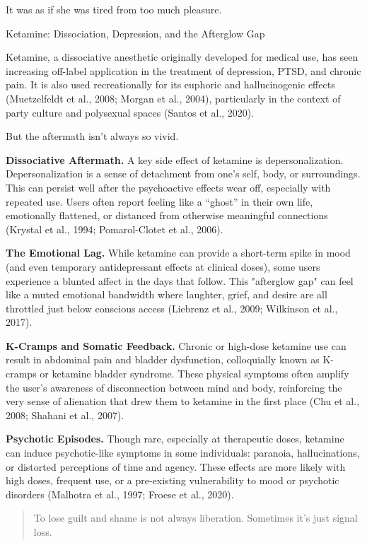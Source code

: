 It was as if she was tired from too much pleasure.

\medskip

\begin{TechnicalSidebar}{Ketamine: Dissociation, Depression, and the Afterglow Gap}

  Ketamine, a dissociative anesthetic originally developed for medical use, has seen increasing 
  off-label application in the treatment of depression, PTSD, and chronic pain. It is also used 
  recreationally for its euphoric and hallucinogenic effects (Muetzelfeldt et al., 2008; Morgan et al., 2004), 
  particularly in the context of party culture and polysexual spaces (Santos et al., 2020).

  \medskip
  
  But the aftermath isn’t always so vivid.

  \medskip
  
  \textbf{Dissociative Aftermath.}  
  A key side effect of ketamine is depersonalization. Depersonalization is a sense of detachment from one’s self, body, 
  or surroundings. This can persist well after the psychoactive effects wear off, especially with 
  repeated use. Users often report feeling like a “ghost” in their own life, emotionally flattened, 
  or distanced from otherwise meaningful connections (Krystal et al., 1994; Pomarol-Clotet et al., 2006).

  \medskip
  
  \textbf{The Emotional Lag.}  
  While ketamine can provide a short-term spike in mood (and even temporary antidepressant effects 
  at clinical doses), some users experience a blunted affect in the days that follow. This "afterglow 
  gap" can feel like a muted emotional bandwidth where laughter, grief, and desire are all throttled 
  just below conscious access (Liebrenz et al., 2009; Wilkinson et al., 2017).
  
  \medskip

  \textbf{K-Cramps and Somatic Feedback.}  
  Chronic or high-dose ketamine use can result in abdominal pain and bladder dysfunction, colloquially 
  known as K-cramps or ketamine bladder syndrome. These physical symptoms often amplify the user's 
  awareness of disconnection between mind and body, reinforcing the very sense of alienation that 
  drew them to ketamine in the first place (Chu et al., 2008; Shahani et al., 2007).

  \medskip

  \textbf{Psychotic Episodes.}  
  Though rare, especially at therapeutic doses, ketamine can induce psychotic-like symptoms in some 
  individuals: paranoia, hallucinations, or distorted perceptions of time and agency. These effects 
  are more likely with high doses, frequent use, or a pre-existing vulnerability to mood or 
  psychotic disorders (Malhotra et al., 1997; Froese et al., 2020).
  
  \begin{quote}
  To lose guilt and shame is not always liberation. Sometimes it’s just signal loss.
  \end{quote}

\end{TechnicalSidebar}


